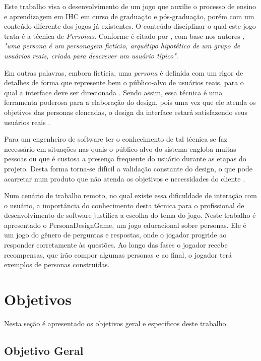 Este trabalho visa o desenvolvimento de um jogo que auxilie o processo de ensino e aprendizagem em IHC em curso de graduação e pós-graduação, porém com um conteúdo diferente dos jogos já existentes. O conteúdo disciplinar o qual este jogo trata é a técnica de \textit{Personas}. Conforme é citado por \cite[p. 176]{barbosa_silva}, com base nos autores , \textit{"uma persona é um personagem fictício, arquétipo hipotético de um grupo de usuários reais, criada para descrever um usuário típico"}. 

Em outras palavras, embora fictícia, uma \textit{persona} é definida com um rigor de detalhes de forma que represente bem o público-alvo de usuários reais, para o qual a interface deve ser direcionada  \cite[p. 177]{barbosa_silva}. Sendo assim, essa técnica é uma ferramenta poderosa para a elaboração do design, pois uma vez que ele atenda os objetivos das personas elencadas, o design da interface estará satisfazendo seus usuários reais \cite[p. 77]{cooper99}.

Para um engenheiro de software ter o conhecimento de tal técnica se faz necessário em situações nas quais o público-alvo do sistema engloba muitas pessoas ou que é custosa a presença frequente do usuário durante as etapas do projeto. Desta forma torna-se difícil a validação constante do design, o que pode acarretar num produto que não atenda os objetivos e necessidades do cliente \cite[p. 176]{barbosa_silva}.

{\color{textmodified}
Num cenário de trabalho remoto, no qual existe essa dificuldade de interação com o usuário, a importância do conhecimento desta técnica para o profissional de desenvolvimento de software justifica a escolha do tema do jogo. Neste trabalho é apresentado o PersonaDesignGame, um jogo educacional sobre personas. Ele é um jogo do gênero de perguntas e respostas, onde o jogador progride ao responder corretamente às questões. Ao longo das fases o jogador recebe recompensas, que irão compor algumas personas e ao final, o jogador terá exemplos de personas construídas.
}
\section{Objetivos}
\label{sec:objetivos}

{\color{textadded}
Nesta seção é apresentado os objetivos geral e específicos deste trabalho.
}

\subsection{Objetivo Geral}

